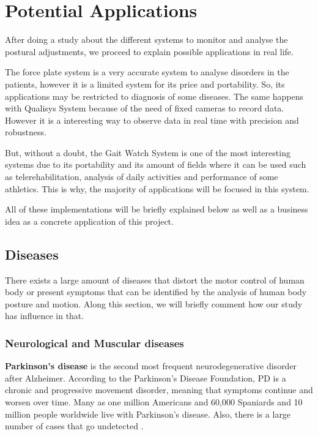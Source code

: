 \chapter{Potential Applications}
\label{ch:Applications}

After doing a study about the different systems to monitor and analyse the postural adjustments, we proceed to explain possible applications in real life.

The force plate system is a very accurate system to analyse disorders in the patients, however it is a limited system for its price and portability. So, its applications may be restricted to diagnosis of some diseases.
The same happens with Qualisys System because of the need of fixed cameras to record data. However it is a interesting way to observe data in real time with precision and robustness.

But, without a doubt, the Gait Watch System is one of the most interesting systems due to its portability and its amount of fields where it can be used such as telerehabilitation, analysis of daily activities and performance of some athletics. This is why, the majority of applications will be focused in this system.

All of these implementations will be briefly explained below as well as a business idea as a concrete application of this project.

\section{Diseases}
There exists a large amount of diseases that distort the motor control of human body or present symptoms that can be identified by the analysis of human body posture and motion. Along this section,  we will briefly comment how our study has influence in that.
\vfill

\subsection{Neurological and Muscular diseases}
\textbf{Parkinson’s disease} is the second most frequent neurodegenerative disorder after Alzheimer\cite{AppPD}. According to the Parkinson’s Disease Foundation, PD is a chronic and progressive movement disorder, meaning that symptoms continue and worsen over time\cite{pdf}.
Many as one million Americans and 60,000 Spaniards and 10 million people worldwide live with Parkinson’s disease. Also, there is a large number of cases that go undetected \cite{A.Olivares2013}.

